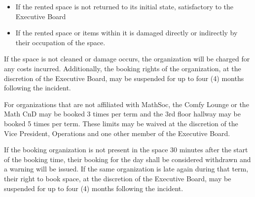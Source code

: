 \begin{itemize}
	\item If the rented space is not returned to its initial state, satisfactory to the Executive Board
	\item If the rented space or items within it is damaged directly or indirectly by their occupation
	      of the space.
\end{itemize}

If the space is not cleaned or damage occurs, the organization will be charged for any costs
incurred.
Additionally, the booking rights of the organization, at the discretion of the Executive Board,
may be suspended for up to four (4) months following the incident. 

For organizations that are not affiliated with MathSoc, the Comfy Lounge or the Math CnD may be 
booked 3 times per term and the 3rd floor hallway may be booked 5 times per term. These limits may 
be waived at the discretion of the Vice President, Operations and one other member of the Executive Board. 

If the booking organization is not present in the space 30 minutes after the start of the booking time, 
their booking for the day shall be considered withdrawn and a warning will be issued. If the same 
organization is late again during that term, their right to book space, at the discretion of the Executive 
Board, may be suspended for up to four (4) months following the incident.

